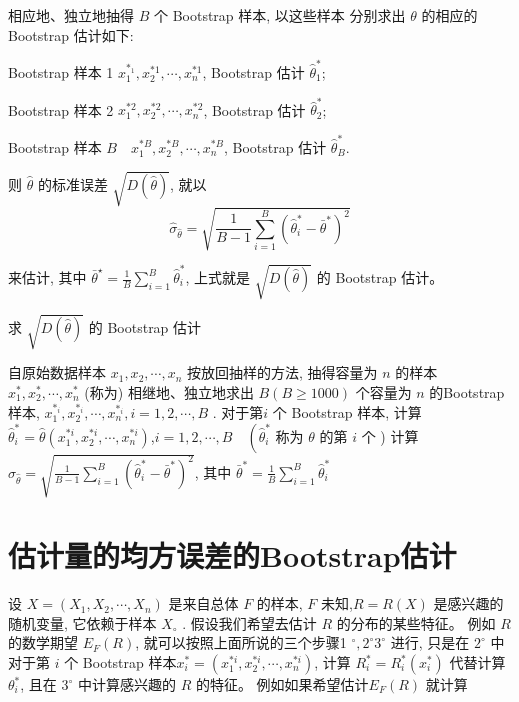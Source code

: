 相应地、独立地抽得 $ B $ 个 Bootstrap 样本, 以这些样本 分别求出 $ \theta $ 的相应的 Bootstrap 估计如下:

Bootstrap 样本 1 $ x_{1}^{*_{1}}, x_{2}^{* 1}, \cdots, x_{n}^{* 1} $, Bootstrap 估计 $ \hat{\theta}_{1}^{*} $;

Bootstrap 样本 2 $ x_{1}^{* 2}, x_{2}^{* 2}, \cdots, x_{n}^{* 2} $, Bootstrap 估计 $ \hat{\theta}_{2}^{*} $;

Bootstrap 样本 $ {B} \quad {x}_{1}^{* B}, {x}_{2}^{* B}, \cdots, {x}_{n}^{* B} $, Bootstrap 估计 $ \hat{\theta}_{B}^{*} $.

则 $ \hat{\theta} $ 的标准误差 $ \sqrt{D(\hat{\theta})} $, 就以
$$
\hat{\sigma}_{\hat{\theta}}=\sqrt{\frac{1}{B-1} \sum_{i=1}^{B}\left(\hat{\theta}_{i}^{*}-\bar{\theta}^{*}\right)^{2}}
$$

来估计, 其中 $ \bar{\theta}^{\star}=\frac{1}{B} \sum_{i=1}^{B} \hat{\theta}_{i}^{*} $, 上式就是 $ \sqrt{D(\hat{\theta})} $ 的 Bootstrap 估计。 

\begin{algorithm}
    \caption{求 $ \sqrt{D(\hat{\theta})} $ 的 Bootstrap 估计}
    自原始数据样本 $ x_{1}, x_{2}, \cdots, x_{n} $ 按放回抽样的方法, 抽得容量为 $ n $ 的样本 $ x_{1}^{*}, x_{2}^{*}, \cdots, x_{n}^{*} $ (称为)\;
    相继地、独立地求出 $ B(B \geq 1000) $ 个容量为 $ n $ 的Bootstrap 样本, $ x_{1}^{*_{i}}, x_{2}^{*_{i}}, \cdots, x_{n}^{*_{i}}, {i}={1}, {2}, \cdots, {B} $ .  对于第$ {i} $ 个 Bootstrap 样本, 计算 $ \hat{\theta}_{i}^{*}=\hat{\theta}\left(x_{1}^{* i}, x_{2}^{* i}, \cdots, x_{n}^{* i}\right) $,$ {i}={1}, {2}, \cdots, B \quad\left(\hat{\theta}_{i}^{*}\right. $ 称为 $ \theta $ 的第 $ {i} $ 个 )\;
    计算$ \hat{\sigma}_{\hat{\theta}}=\sqrt{\frac{1}{B-1} \sum_{i=1}^{B}\left(\hat{\theta}_{i}^{*}-\bar{\theta}^{*}\right)^{2}} $, 其中 $ \bar{\theta}^{*}=\frac{1}{B} \sum_{i=1}^{B} \hat{\theta}_{i}^{*} $
\end{algorithm}

\section{估计量的均方误差的Bootstrap估计}

设 $ X=\left(X_{1}, X_{2}, \cdots, X_{n}\right) $ 是来自总体 $ F $ 的样本, $ F $ 未知,$ {R}={R}({X}) $ 是感兴趣的随机变量, 它依赖于样本 $ {X}_{\circ} $ . 假设我们希望去估计 $ R $ 的分布的某些特征。 例如 $ R $ 的数学期望 $ E_{F}({R}) $, 就可以按照上面所说的三个步骤1 $ ^{\circ}, 2^{\circ} $$ 3^{\circ} $ 进行, 只是在 $ 2^{\circ} $ 中对于第 $ {i} $ 个 Bootstrap 样本$ {x}_{i}^{*}=\left(x_{1}^{* i}, x_{2}^{* i}, \cdots, x_{n}^{* i}\right) $, 计算 $ R_{i}^{*}=R_{i}^{*}\left(x_{i}^{*}\right) $ 代替计算 $ \theta_{i}^{*} $, 且在 $ 3^{\circ} $ 中计算感兴趣的 $ R $ 的特征。 例如如果希望估计$ {E}_{F}({R}) $ 就计算

